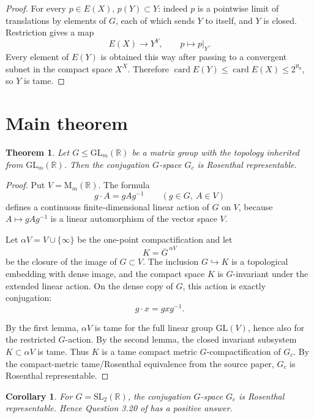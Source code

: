 \documentclass[11pt]{article}
\newtheorem{theorem}{Theorem}
\newtheorem{corollary}{Corollary}
\newcommand{\R}{\mathbb{R}}
\newcommand{\SL}{\mathrm{SL}}
\newcommand{\GL}{\mathrm{GL}}
\newcommand{\Mat}{\mathrm{M}}
\newcommand{\card}{\operatorname{card}}
\begin{document}
\begin{proof}
For every \(p\in E(X)\), \(p(Y)\subset Y\): indeed \(p\) is a pointwise
limit of translations by elements of \(G\), each of which sends \(Y\)
to itself, and \(Y\) is closed.  Restriction gives a map
\[
E(X)\longrightarrow Y^Y,\qquad p\mapsto p|_Y .
\]
Every element of \(E(Y)\) is obtained this way after passing to a
convergent subnet in the compact space \(X^X\).  Therefore
\(\card E(Y)\leq \card E(X)\leq 2^{\aleph_0}\), so \(Y\) is tame.
\end{proof}

\section*{Main theorem}

\begin{theorem}
Let \(G\leq \GL_m(\R)\) be a matrix group with the topology inherited
from \(\GL_m(\R)\).  Then the conjugation \(G\)-space \(G_c\) is
Rosenthal representable.
\end{theorem}

\begin{proof}
Put \(V=\Mat_m(\R)\).  The formula
\[
g\cdot A=gAg^{-1}\qquad (g\in G,\ A\in V)
\]
defines a continuous finite-dimensional linear action of \(G\) on
\(V\), because \(A\mapsto gAg^{-1}\) is a linear automorphism of the
vector space \(V\).

Let \(\alpha V=V\cup\{\infty\}\) be the one-point compactification and
let
\[
K=\overline{G}^{\,\alpha V}
\]
be the closure of the image of \(G\subset V\).  The inclusion
\(G\hookrightarrow K\) is a topological embedding with dense image, and
the compact space \(K\) is \(G\)-invariant under the extended linear
action.  On the dense copy of \(G\), this action is exactly
conjugation:
\[
g\cdot x=gxg^{-1}.
\]

By the first lemma, \(\alpha V\) is tame for the full linear group
\(\GL(V)\), hence also for the restricted \(G\)-action.  By the second
lemma, the closed invariant subsystem \(K\subset\alpha V\) is tame.
Thus \(K\) is a tame compact metric \(G\)-compactification of \(G_c\).
By the compact-metric tame/Rosenthal equivalence from the source paper,
\(G_c\) is Rosenthal representable.
\end{proof}

\begin{corollary}
For \(G=\SL_2(\R)\), the conjugation \(G\)-space \(G_c\) is Rosenthal
representable.  Hence Question 3.20 of \cite{Megrelishvili} has a
positive answer.
\end{corollary}
\end{document}
